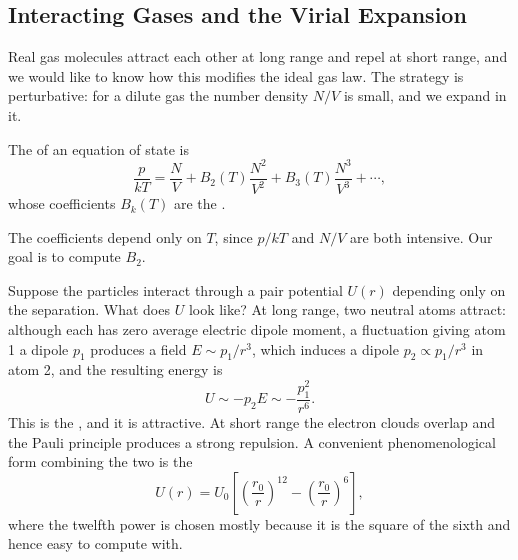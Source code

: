 \subsection{Interacting Gases and the Virial Expansion}

Real gas molecules attract each other at long range and repel at short range, and we would like to know how this modifies the ideal gas law. The strategy is perturbative: for a dilute gas the number density $N/V$ is small, and we expand in it.

\begin{definition}
	The  of an equation of state is
	$$
	\frac{p}{kT} = \frac NV + B_2(T)\frac{N^2}{V^2} + B_3(T)\frac{N^3}{V^3} + \cdots,
	$$
	whose coefficients $B_k(T)$ are the .
\end{definition}

The coefficients depend only on $T$, since $p/kT$ and $N/V$ are both intensive. Our goal is to compute $B_2$.

Suppose the particles interact through a pair potential $U(r)$ depending only on the separation. What does $U$ look like? At long range, two neutral atoms attract: although each has zero average electric dipole moment, a fluctuation giving atom 1 a dipole $p_1$ produces a field $E \sim p_1/r^3$, which induces a dipole $p_2 \propto p_1/r^3$ in atom 2, and the resulting energy is
$$
U \sim -p_2 E \sim -\frac{p_1^2}{r^6}.
$$
This is the , and it is attractive. At short range the electron clouds overlap and the Pauli principle produces a strong repulsion. A convenient phenomenological form combining the two is the 
$$
U(r) = U_0\left[\left(\frac{r_0}{r}\right)^{12} - \left(\frac{r_0}{r}\right)^6\right],
$$
where the twelfth power is chosen mostly because it is the square of the sixth and hence easy to compute with.

